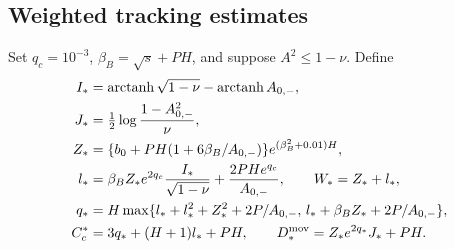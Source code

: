 \documentclass[10pt]{article}
\theoremstyle{remark}\newtheorem{remark}[theorem]{Remark}
\begin{document}
\subsection{Weighted tracking estimates}

Set $q_c=10^{-3}$, $\beta_B=\sqrt{s}+PH$, and suppose $A^2\le1-\nu$.
Define
\begin{align*}
 I_*&=\operatorname{arctanh}\sqrt{1-\nu}
                 -\operatorname{arctanh}A_{0,-},\\
 J_*&=\tfrac12\log\frac{1-A_{0,-}^2}{\nu},\\
 Z_*&=\{b_0+PH(1+6\beta_B/A_{0,-})\}
                  e^{(\beta_B^2+0.01)H},\\
 l_*&=\beta_B Z_*e^{2q_c}\frac{I_*}{\sqrt{1-\nu}}
               +\frac{2PH e^{q_c}}{A_{0,-}},\qquad W_*=Z_*+l_*,\\
 q_*&=H\max\{l_*+l_*^2+Z_*^2+2P/A_{0,-},\,
                     l_*+\beta_BZ_*+2P/A_{0,-}\},\\
 C_c^*&=3q_*+(H+1)l_*+PH,\qquad
 D_*^{\rm mov}=Z_*e^{2q_*}J_*+PH.
\end{align*}
\end{document}
